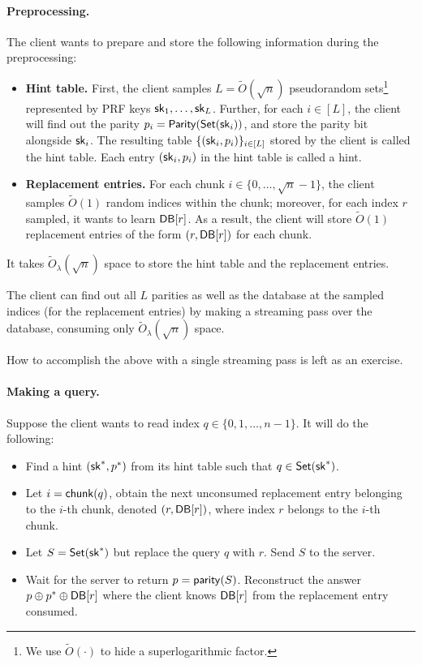 \paragraph{Preprocessing.}
The client wants to prepare and store the following information during the preprocessing:  
\begin{itemize}
\item 
{\bf Hint table.}
First, the client samples
$L = \widetilde{O}(\sqrt{n})$
pseudorandom sets\footnote{We use $\widetilde{O}(\cdot)$ to hide
a superlogarithmic factor.} represented by PRF keys ${\sf sk}_1, \ldots, {\sf sk}_L$.
Further, for each $i \in [L]$, the client will 
find out the parity 
$p_i = {\sf Parity}({\sf Set}({\sf sk}_i))$, and store the parity bit alongside ${\sf sk}_i$.
The resulting table $\{({\sf sk}_i, p_i)\}_{i \in [L]}$ 
stored by the client
is called the hint table.
Each entry $({\sf sk}_i, p_i)$ in the hint table is called a hint.
\item 
{\bf Replacement entries.}
For each chunk $i \in \{0, \ldots, \sqrt{n}-1\}$, the client
samples $\widetilde{O}(1)$
random indices within the chunk; moreover, for each index $r$ sampled,
it wants to learn ${\sf DB}[r]$.  
As a result, the client will store $\widetilde{O}(1)$
replacement entries of the form $(r, {\sf DB}[r])$ for each chunk. 
\end{itemize}

It takes $\widetilde{O}_\lambda(\sqrt{n})$ space to
store the hint table and the replacement entries.

\begin{claim}
The client can find out all $L$ parities
as well as
the database at the sampled indices (for the replacement entries)
by making a streaming pass over the database, consuming
only $\widetilde{O}_\lambda(\sqrt{n})$ space.
\end{claim}
How to accomplish the above with a single streaming pass is left as an exercise.

\paragraph{Making a query.}
Suppose the client wants to read index
$q \in \{0, 1, \ldots, n-1\}$.
It will do the following: 
\begin{itemize}
\item 
Find a hint $({\sf sk}^*, p^*)$
from its hint table such that $q \in {\sf Set}({\sf sk}^*)$.
\item 
Let $i = {\sf chunk}(q)$, obtain the next unconsumed
replacement entry belonging to the $i$-th chunk, denoted $(r, {\sf DB}[r])$,
where index $r$ belongs
to the $i$-th chunk.
\item 
Let $S = {\sf Set}({\sf sk}^*)$ but 
replace the query $q$ with $r$. 
Send $S$ to the server. 
\item 
Wait for the server to return 
$p = {\sf parity}(S)$.
Reconstruct the answer $p \oplus p^* \oplus {\sf DB}[r]$ where the client knows ${\sf DB}[r]$
from the replacement entry consumed.
\end{itemize}

